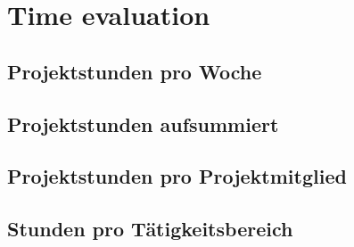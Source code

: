 \section{Time evaluation}

\subsection{Projektstunden pro Woche}

\subsection{Projektstunden aufsummiert}

\subsection{Projektstunden pro Projektmitglied}

\subsection{Stunden pro Tätigkeitsbereich}
